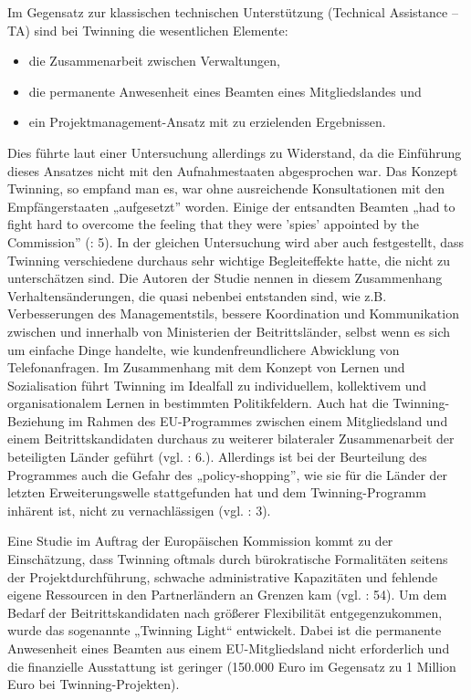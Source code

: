Im Gegensatz zur klassischen technischen Unterstützung (Technical Assistance – TA) sind bei Twinning die wesentlichen Elemente:
\begin{itemize}
\item die Zusammenarbeit zwischen Verwaltungen, 
\item die permanente Anwesenheit eines Beamten eines Mitgliedslandes und
\item ein Projektmanagement-Ansatz mit zu erzielenden Ergebnissen. 
\end{itemize}
Dies führte laut einer Untersuchung allerdings zu Widerstand, da die Einführung dieses Ansatzes nicht mit den Aufnahmestaaten abgesprochen war. Das Konzept Twinning, so empfand man es, war ohne ausreichende Konsultationen mit den Empfängerstaaten „aufgesetzt” worden. Einige der entsandten Beamten „had to fight hard to overcome the feeling that they were 'spies' appointed by the Commission” (\cite{coojoh}: 5). In der gleichen Untersuchung wird aber auch festgestellt, dass Twinning verschiedene durchaus sehr wichtige Begleiteffekte hatte, die nicht zu unterschätzen sind. Die Autoren der Studie nennen in diesem Zusammenhang Verhaltensänderungen, die quasi nebenbei entstanden sind, wie z.B. Verbesserungen des Managementstils, bessere Koordination und Kommunikation zwischen und innerhalb von Ministerien der Beitrittsländer, selbst wenn es sich um einfache Dinge handelte, wie kundenfreundlichere Abwicklung von Telefonanfragen. Im Zusammenhang mit dem Konzept von Lernen und Sozialisation führt Twinning im Idealfall zu individuellem, kollektivem und organisationalem Lernen in bestimmten Politikfeldern. Auch hat die Twinning-Beziehung im Rahmen des EU-Programmes zwischen einem Mitgliedsland und einem Beitrittskandidaten durchaus zu weiterer bilateraler Zusammenarbeit der beteiligten Länder geführt (vgl. \cite{coojoh}: 6.). Allerdings ist bei der Beurteilung des Programmes auch die Gefahr des „policy-shopping”, wie sie für die Länder der letzten Erweiterungswelle stattgefunden hat und dem Twinning-Programm inhärent ist, nicht zu vernachlässigen (vgl. \cite{meyersah08b}: 3).\par
Eine Studie im Auftrag der Europäischen Kommission kommt zu der Einschätzung, dass Twinning oftmals durch bürokratische Formalitäten seitens der Projektdurchführung, schwache administrative Kapazitäten und fehlende eigene Ressourcen in den Partnerländern an Grenzen kam (vgl. \cite{koenigova}: 54). Um dem Bedarf der Beitrittskandidaten nach größerer Flexibilität entgegenzukommen, wurde das sogenannte „Twinning Light“ entwickelt. Dabei ist die permanente Anwesenheit eines Beamten aus einem EU-Mitgliedsland nicht erforderlich und die finanzielle Ausstattung ist geringer (150.000 Euro im Gegensatz zu 1 Million Euro bei Twinning-Projekten).\par
